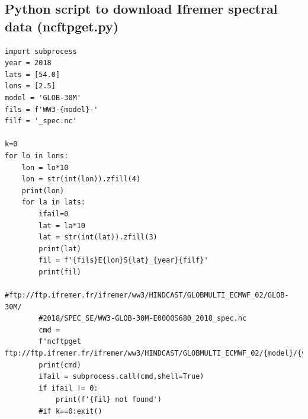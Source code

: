 \documentclass[preprints,briefreport,accept,oneauthor,pdftex]{Definitions/mdpi}
\begin{document}
\subsection{Python script to download Ifremer spectral data (ncftpget.py) }
\begin{verbatim}
import subprocess
year = 2018
lats = [54.0]
lons = [2.5]
model = 'GLOB-30M'
fils = f'WW3-{model}-'
filf = '_spec.nc'

k=0
for lo in lons:
    lon = lo*10
    lon = str(int(lon)).zfill(4)
    print(lon)
    for la in lats:
        ifail=0
        lat = la*10
        lat = str(int(lat)).zfill(3)
        print(lat)
        fil = f'{fils}E{lon}S{lat}_{year}{filf}'
        print(fil)
        #ftp://ftp.ifremer.fr/ifremer/ww3/HINDCAST/GLOBMULTI_ECMWF_02/GLOB-30M/
        #2018/SPEC_SE/WW3-GLOB-30M-E0000S680_2018_spec.nc
        cmd =
        f'ncftpget ftp://ftp.ifremer.fr/ifremer/ww3/HINDCAST/GLOBMULTI_ECMWF_02/{model}/{year}/SPEC_SE/{fil}'
        print(cmd)
        ifail = subprocess.call(cmd,shell=True)
        if ifail != 0:
            print(f'{fil} not found')
        #if k==0:exit()

\end{verbatim}



\end{document}
